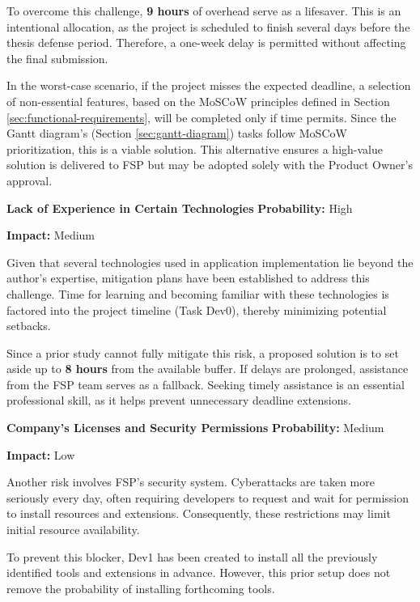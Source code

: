 To overcome this challenge, \textbf{9  hours} of overhead serve as a lifesaver. This is an intentional allocation, as the project is scheduled to finish several days before the thesis defense period. Therefore, a one-week delay is permitted without affecting the final submission.

In the worst-case scenario, if the project misses the expected deadline, a selection of non-essential features, based on the MoSCoW principles defined in Section \ref{sec:functional-requirements}, will be completed only if time permits. Since the Gantt diagram's (Section \ref{sec:gantt-diagram}) tasks follow MoSCoW prioritization, this is a viable solution. This alternative ensures a high-value solution is delivered to FSP but may be adopted solely with the Product Owner's approval. 

\vspace{10pt}

\newpage

\noindent\textbf{Lack of Experience in Certain Technologies}  \hfill \textbf{Probability:} High
 
\hfill \textbf{Impact:} Medium

Given that several technologies used in application implementation lie beyond the author's expertise, mitigation plans have been established to address this challenge. Time for learning and becoming familiar with these technologies is factored into the project timeline (Task Dev0), thereby minimizing potential setbacks. 

Since a prior study cannot fully mitigate this risk, a proposed solution is to set aside up to \textbf{8 hours} from the available buffer. If delays are prolonged, assistance from the FSP team serves as a fallback. Seeking timely assistance is an essential professional skill, as it helps prevent unnecessary deadline extensions.

\vspace{10pt}

\noindent\textbf{Company's Licenses and Security Permissions} \hfill \textbf{Probability:} Medium
 
\hfill \textbf{Impact:} Low

Another risk involves FSP's security system. Cyberattacks are taken more seriously every day, often requiring developers to request and wait for permission to install resources and extensions. Consequently, these restrictions may limit initial resource availability. 

To prevent this blocker, Dev1 has been created to install all the previously identified tools and extensions in advance. However, this prior setup does not remove the probability of installing forthcoming tools.

